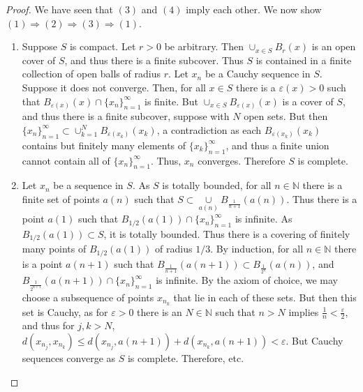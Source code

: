 \documentclass[crop=false,class=book,oneside]{standalone}
\begin{document}
            \begin{proof}
            We have seen that $(3)$ and $(4)$ imply each other. We now show $(1)\Rightarrow (2)\Rightarrow (3) \Rightarrow (1)$.
            \begin{enumerate}
            \item Suppose $S$ is compact. Let $r>0$ be arbitrary. Then $\cup_{x\in S}B_{r}(x)$ is an open cover of $S$, and thus there is a finite subcover. Thus $S$ is contained in a finite collection of open balls of radius $r$. Let $x_n$ be a Cauchy sequence in $S$. Suppose it does not converge. Then, for all $x\in S$ there is a $\varepsilon(x)>0$ such that $B_{\varepsilon(x)}(x)\cap \{x_n\}_{n=1}^{\infty}$ is finite. But $\cup_{x\in S}B_{\varepsilon(x)}(x)$ is a cover of $S$, and thus there is a finite subcover, suppose with $N$ open sets. But then $\{x_n\}_{n=1}^{\infty}\subset \cup_{k=1}^{N}B_{\varepsilon(x_k)}(x_k)$, a contradiction as each $B_{\varepsilon(x_k)}(x_k)$ contains but finitely many elements of $\{x_k\}_{n=1}^{\infty}$, and thus a finite union cannot contain all of $\{x_n\}_{n=1}^{\infty}$. Thus, $x_n$ converges. Therefore $S$ is complete.
            \item Let $x_n$ be a sequence in $S$. As $S$ is totally bounded, for all $n\in \mathbb{N}$ there is a finite set of points $a(n)$ such that $S\subset \underset{a(n)}\cup B_{\frac{1}{n+1}}(a(n))$. Thus there is a point $a(1)$ such that $B_{1/2}(a(1))\cap \{x_n\}_{n=1}^{\infty}$ is infinite. As $B_{1/2}(a(1))\subset S$, it is totally bounded. Thus there is a covering of finitely many points of $B_{1/2}(a(1))$ of radius $1/3$. By induction, for all $n\in \mathbb{N}$ there is a point $a(n+1)$ such that $B_{\frac{1}{n+1}}(a(n+1))\subset B_{\frac{1}{2^{n}}}(a(n))$, and $B_{\frac{1}{2^{n+1}}}(a(n+1))\cap \{x_n\}_{n=1}^{\infty}$ is infinite. By the axiom of choice, we may choose a subsequence of points $x_{n_k}$ that lie in each of these sets. But then this set is Cauchy, as for $\varepsilon>0$ there is an $N\in \mathbb{N}$ such that $n>N$ implies $\frac{1}{n}<\frac{\varepsilon}{2}$, and thus for $j,k>N$, $d(x_{n_j},x_{n_k})\leq d(x_{n_j},a(n+1))+d(x_{n_k},a(n+1))<\varepsilon$. But Cauchy sequences converge as $S$ is complete. Therefore, etc.

\end{enumerate}
\end{proof}
\end{document}
